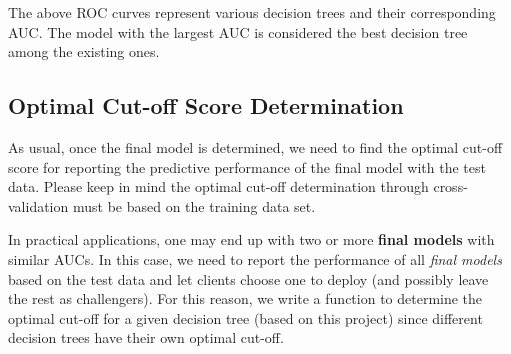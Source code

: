 \documentclass[
]{book}
\begin{document}
The above ROC curves represent various decision trees and their corresponding AUC. The model with the largest AUC is considered the best decision tree among the existing ones.

\hfill\break

\hypertarget{optimal-cut-off-score-determination}{%
\subsection{Optimal Cut-off Score Determination}\label{optimal-cut-off-score-determination}}

As usual, once the final model is determined, we need to find the optimal cut-off score for reporting the predictive performance of the final model with the test data. Please keep in mind the optimal cut-off determination through cross-validation must be based on the training data set.

In practical applications, one may end up with two or more \textbf{final models} with similar AUCs. In this case, we need to report the performance of all \emph{final models} based on the test data and let clients choose one to deploy (and possibly leave the rest as challengers). For this reason, we write a function to determine the optimal cut-off for a given decision tree (based on this project) since different decision trees have their own optimal cut-off.
\end{document}
